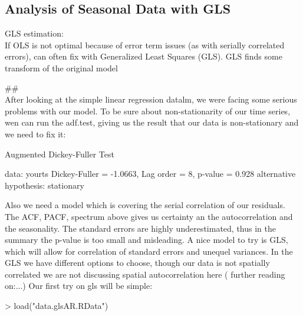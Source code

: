 \documentclass[11pt, a4paper]{article} %
\begin{document}
\subsection{Analysis of Seasonal Data with GLS}

GLS estimation:\\
If OLS is not optimal because of error term issues (as with serially correlated errors),
can often fix with Generalized Least Squares (GLS). GLS finds some transform of the original
model %


##\\
\linebreak
After looking at the simple linear regression datalm, we were facing some serious problems with our model.
To be sure about non-stationarity of our time series, wen can run the adf.test, giving us the result that our data is non-stationary and we need to fix it:
\begin{Schunk}
\begin{Soutput}
	Augmented Dickey-Fuller Test

data:  yourts
Dickey-Fuller = -1.0663, Lag order = 8, p-value =
0.928
alternative hypothesis: stationary
\end{Soutput}
\end{Schunk}
Also we need a model which is covering the serial correlation of our residuals. The ACF, PACF, spectrum above gives us certainty an the autocorrelation and the seasonality.
The standard errors are highly underestimated, thus in the summary the p-value is too small and misleading.
A nice model to try is GLS, which will allow for correlation of standard errors and unequel variances.
In the GLS we have different options to choose, though our data is not spatially correlated we are not discussing spatial autocorrelation here ( further reading on:...)
Our first try on gls will be simple:
\begin{Schunk}
\end{Schunk}

\begin{Schunk}
\begin{Sinput}
> load("data.glsAR.RData")
\end{Sinput}
\end{Schunk}
\end{document}

